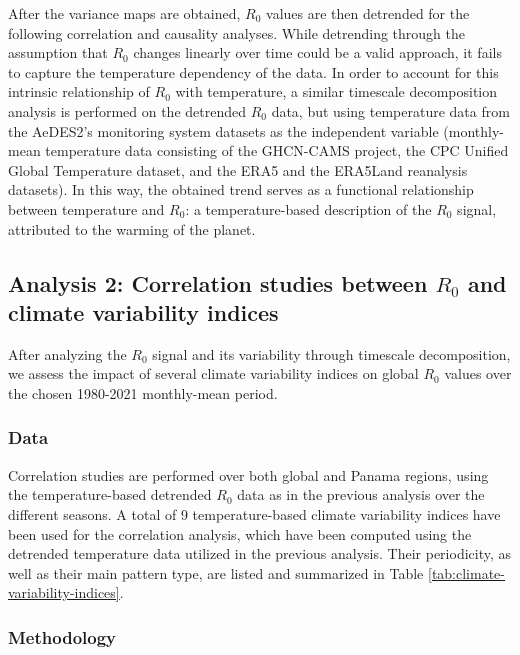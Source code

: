 \documentclass[10pt,twocolumn]{wlscirep}
\begin{document}
After the variance maps are obtained, $R_0$ values are then detrended for the following correlation and causality analyses. While detrending through the assumption that $R_0$ changes linearly over time could be a valid approach, it fails to capture the temperature dependency of the data. In order to account for this intrinsic relationship of $R_0$ with temperature, a similar timescale decomposition analysis is performed on the detrended $R_0$ data, but using temperature data from the AeDES2's monitoring system datasets as the independent variable (monthly-mean temperature data consisting of the GHCN-CAMS project\cite{fan_2008}, the CPC Unified Global Temperature dataset\cite{xie_2007}, and the ERA5 and the ERA5Land reanalysis datasets\cite{chen_2008}). In this way, the obtained trend serves as a functional relationship between temperature and $R_0$: a temperature-based description of the $R_0$ signal, attributed to the warming of the planet\cite{greene_2011}.

\subsection{Analysis 2: Correlation studies between $R_0$ and climate variability indices} \label{sec-methods-2}

After analyzing the $R_0$ signal and its variability through timescale decomposition, we assess the impact of several climate variability indices on global $R_0$ values over the chosen 1980-2021 monthly-mean period.

\subsubsection{Data} \label{sec-methods-2-data}

Correlation studies are performed over both global and Panama regions, using the temperature-based detrended $R_0$ data as in the previous analysis over the different seasons. A total of 9 temperature-based climate variability indices have been used for the correlation analysis, which have been computed using the detrended temperature data utilized in the previous analysis. Their periodicity, as well as their main pattern type, are listed and summarized in Table \ref{tab:climate-variability-indices}.


\subsubsection{Methodology} \label{sec-methods-2-methodology}
\end{document}
